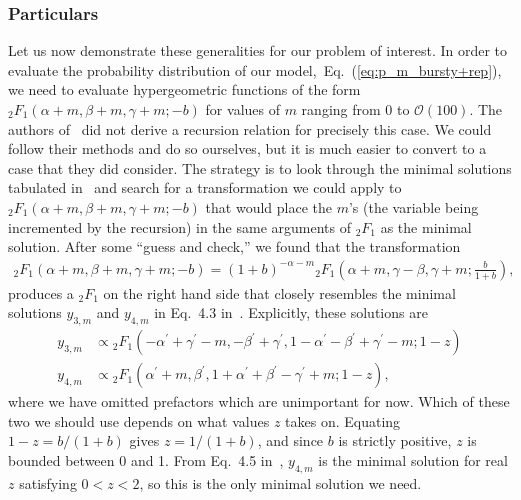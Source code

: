 \documentclass[12pt]{article}%
\newcommand{\eq}[1]{Eq.~(\ref{#1})}
\begin{document}
\subsubsection{Particulars}
Let us now demonstrate these generalities for our problem of interest.
In order to evaluate the probability distribution of our
model,~\eq{eq:p_m_bursty+rep}, we need to evaluate hypergeometric functions
of the form ${_2F_1}(\alpha+m, \beta+m, \gamma+m; -b)$
for values of $m$ ranging from $0$ to $\mathcal{O}(100)$.
The authors of~\cite{Gil2007} did not derive a recursion relation
for precisely this case. We could follow their methods and do so ourselves,
but it is much easier to convert to a case that they did consider.
The strategy is to look through the minimal solutions tabulated
in~\cite{Gil2007} and search for a transformation we could apply to
${_2F_1}(\alpha+m, \beta+m, \gamma+m; -b)$ that would place the $m$'s
(the variable being incremented by the recursion)
in the same arguments of ${_2F_1}$ as the minimal solution.
After some ``guess and check,'' we found that the transformation
\begin{align}
{_2F_1}(\alpha+m, \beta+m, \gamma+m; -b)
=
(1+b)^{-\alpha-m}
        {_2F_1}\left(\alpha+m, \gamma-\beta, \gamma+m; \frac{b}{1+b}\right),
\label{eq:rec_euler_pretransform}
\end{align}
produces a ${_2F_1}$ on the right hand side that closely resembles
the minimal solutions $y_{3,m}$ and $y_{4,m}$ in Eq.~4.3 in~\cite{Gil2007}.
Explicitly, these solutions are
\begin{align}
y_{3,m}
&\propto
{_2F_1}\left(-\alpha^\prime + \gamma^\prime - m,
                -\beta^\prime + \gamma^\prime,
                1-\alpha^\prime-\beta^\prime+\gamma^\prime-m;
                1-z\right)
\\
y_{4,m}
&\propto
{_2F_1}\left(\alpha^\prime + m,
                \beta^\prime,
                1+\alpha^\prime+\beta^\prime-\gamma^\prime+m;
                1-z\right),
\label{eq:minimal_soln_sans_prefac}
\end{align}
where we have omitted prefactors which are unimportant for now.
Which of these two we should use depends on what values $z$ takes on.
Equating $1-z=b/(1+b)$ gives $z=1/(1+b)$, and since $b$ is strictly positive,
$z$ is bounded between 0 and 1.
From Eq.~4.5 in~\cite{Gil2007}, $y_{4,m}$ is the minimal solution
for real $z$ satisfying $0<z<2$, so this is the only minimal solution we need.
\end{document}
